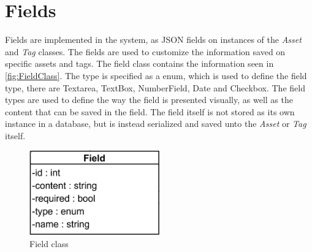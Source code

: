 \section{Fields}
Fields are implemented in the system, as JSON fields on instances of the \textit{Asset} and \textit{Tag} classes. The fields are used to customize the information saved on specific assets and tags. The field class contains the information seen in \autoref{fig:FieldClass}. The type is specified as a enum, which is used to define the field type, there are Textarea, TextBox, NumberField, Date and Checkbox. The field types are used to define the way the field is presented visually, as well as the content that can be saved in the field. The field itself is not stored as its own instance in a database, but is instead serialized and saved unto the \textit{Asset} or \textit{Tag} itself.

\begin{figure}[H]
    \centering
    \includegraphics[width=0.5\textwidth]{figures/FieldClass.PNG}
    \caption{Field class}
    \label{fig:FieldClass}
\end{figure}
